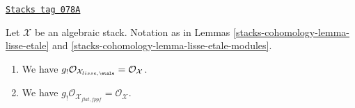 \begin{lemma}
\label{stacks-cohomology-lemma-lisse-etale-structure-sheaf}
\href{https://stacks.math.columbia.edu/tag/078A}{\texttt{Stacks tag 078A}}

Let $\mathcal{X}$ be an algebraic stack. Notation as in
Lemmas \ref{stacks-cohomology-lemma-lisse-etale} and \ref{stacks-cohomology-lemma-lisse-etale-modules}.
\begin{enumerate}
\item We have $g_!\mathcal{O}_{\mathcal{X}_{lisse,\etale}} =
\mathcal{O}_\mathcal{X}$.
\item We have $g_!\mathcal{O}_{\mathcal{X}_{flat, fppf}} =
\mathcal{O}_\mathcal{X}$.
\end{enumerate}
\end{lemma}

